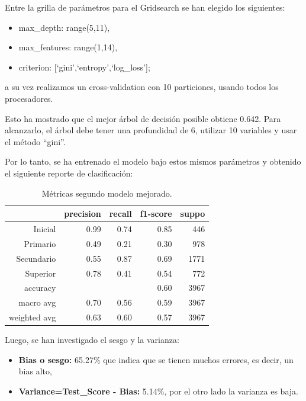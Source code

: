 \documentclass[a4paper]{article}
\begin{document}
            Entre la grilla de parámetros para el Gridsearch se han elegido los siguientes:
            \begin{itemize}
                \item max\_depth: range(5,11),
                \item max\_features: range(1,14),
                \item criterion: [`gini',`entropy',`log\_loss'];
            \end{itemize}
            a su vez realizamos un cross-validation con 10 particiones, usando todos los procesadores.
            
            Esto ha mostrado que el mejor árbol de decisión posible obtiene 0.642. Para alcanzarlo, el árbol debe tener una profundidad de  6, utilizar  10  variables y usar el método ``gini''.

            Por lo tanto, se ha entrenado el modelo bajo estos mismos parámetros y obtenido el siguiente reporte de clasificación:


            \begin{table}[H]
                \centering
                \begin{tabular}{rrrrr}
                    \toprule
                    ~ & precision & recall & f1-score & suppo \\ \midrule
                    Inicial    & 0.99 & 0.74 & 0.85 & 446 \\
                    Primario   & 0.49 & 0.21 & 0.30 & 978 \\
                    Secundario & 0.55 & 0.87 & 0.69 & 1771 \\
                    Superior   & 0.78 & 0.41 & 0.54 & 772 \\
                    accuracy & & & 0.60 & 3967 \\
                    macro avg & 0.70 & 0.56 & 0.59 & 3967 \\
                    weighted avg & 0.63 & 0.60 & 0.57 & 3967 \\
                    \bottomrule
                \end{tabular}
                \caption{Métricas segundo modelo mejorado.}
                \label{New Second model metrics}
            \end{table}

            Luego, se han investigado el sesgo y la varianza:
            \begin{itemize}
                \item \textbf{Bias o sesgo:} 65.27\% que indica que se tienen muchos errores, es decir, un bias alto,
                \item \textbf{Variance=Test\_Score - Bias:} 5.14\%, por el otro lado la varianza es baja.
            \end{itemize}
\end{document}
